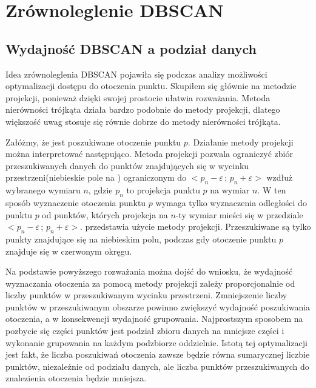 \section{Zrównoleglenie DBSCAN}

\subsection{Wydajność DBSCAN a podział danych}
Idea zrównoleglenia DBSCAN pojawiła się podczas analizy możliwości optymalizacji dostępu do otoczenia punktu. Skupiłem się głównie na metodzie projekcji, ponieważ dzięki swojej prostocie ułatwia rozważania. Metoda nierówności trójkąta działa bardzo podobnie do metody projekcji, dlatego większość uwag stosuje się równie dobrze do metody nierówności trójkąta.\par
Załóżmy, że jest poszukiwane otoczenie punktu $ p $. Działanie metody projekcji można interpretować następująco. Metoda projekcji pozwala ograniczyć zbiór przeszukiwanych danych do punktów znajdujących się w wycinku przestrzeni(niebieskie pole na ) ograniczonym do $ <p_n-\varepsilon\,;\,p_n+\varepsilon> $ wzdłuż wybranego wymiaru $ n $, gdzie $ p_n $ to projekcja punktu $ p $ na wymiar $ n $. W ten sposób wyznaczenie otoczenia punktu $ p $ wymaga tylko wyznaczenia odległości do punktu $ p $ od punktów, których projekcja na $ n $-ty wymiar mieści się w przedziale $ <p_n-\varepsilon\,;\,p_n+\varepsilon> $.  przedstawia użycie metody projekcji. Przeszukiwane są tylko punkty znajdujące się na niebieskim polu, podczas gdy otoczenie punktu $ p $ znajduje się w czerwonym okręgu.\par

Na podstawie powyższego rozważania można dojść do wniosku, że wydajność wyznaczania otoczenia za pomocą metody projekcji zależy proporcjonalnie od liczby punktów w przeszukiwanym wycinku przestrzeni. Zmniejszenie liczby punktów w przeszukiwanym obszarze powinno zwiększyć wydajność poszukiwania otoczenia, a w konsekwencji wydajność grupowania. Najprostszym sposobem na pozbycie się części punktów jest podział zbioru danych na mniejsze części i wykonanie grupowania na każdym podzbiorze oddzielnie. Istotą tej optymalizacji jest fakt, że liczba poszukiwań otoczenia zawsze będzie równa sumarycznej liczbie punktów, niezależnie od podziału danych, ale liczba punktów przeszukiwanych do znalezienia otoczenia będzie mniejsza.\par

